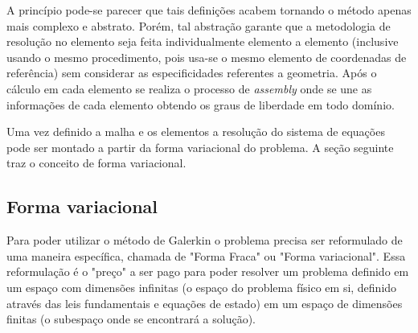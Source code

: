     A princípio pode-se parecer que tais definições acabem tornando o método apenas mais complexo e abstrato. Porém, tal abstração garante que a  metodologia de resolução no elemento seja feita individualmente elemento a elemento (inclusive usando o mesmo procedimento, pois usa-se o mesmo elemento de coordenadas de referência) sem considerar as especificidades referentes a geometria. Após o cálculo em cada elemento se realiza o processo de \textit{assembly} onde se une as informações de cada elemento obtendo os graus de liberdade em todo domínio.
    
    Uma vez definido a malha e os elementos a resolução do sistema de equações  pode ser montado a partir da forma variacional do problema. A seção seguinte traz o conceito de forma variacional.

    \subsection{Forma variacional}
    Para poder utilizar o método de Galerkin o problema precisa ser reformulado de uma maneira específica, chamada de "Forma Fraca" ou "Forma variacional". Essa reformulação é o "preço" a ser pago para poder resolver um problema definido em um espaço com dimensões infinitas (o espaço do problema físico em si, definido através das leis fundamentais e equações de estado) em um espaço de dimensões finitas (o subespaço onde se encontrará a solução).

